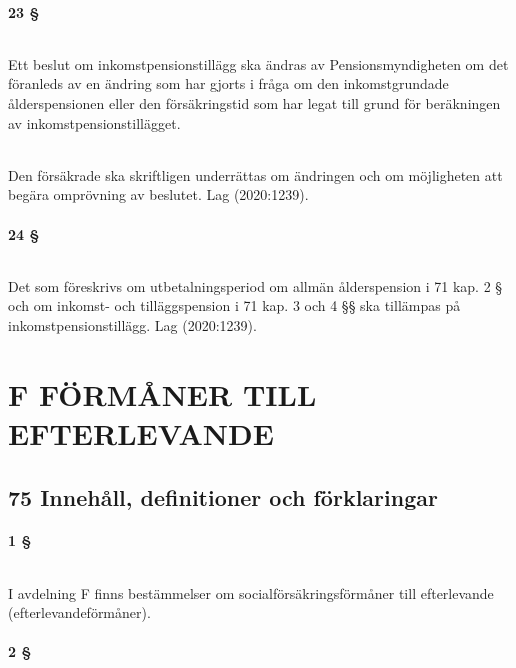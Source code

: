 \documentclass[a4paper,notitlepage,openany,10pt]{book}
\begin{document}
\subsection*{23 §}
\paragraph*{}
Ett beslut om inkomstpensionstillägg ska ändras av Pensionsmyndigheten om det föranleds av en ändring som har gjorts i fråga om den inkomstgrundade ålderspensionen eller den försäkringstid som har legat till grund för beräkningen av inkomstpensionstillägget.
\paragraph*{}
Den försäkrade ska skriftligen underrättas om ändringen och om möjligheten att begära omprövning av beslutet.
Lag (2020:1239).
\subsection*{24 §}
\paragraph*{}
Det som föreskrivs om utbetalningsperiod om allmän ålderspension i 71 kap. 2 § och om inkomst- och tilläggspension i 71 kap. 3 och 4 §§ ska tillämpas på inkomstpensionstillägg.
Lag (2020:1239).
\part*{F FÖRMÅNER TILL EFTERLEVANDE}
\chapter*{75 Innehåll, definitioner och förklaringar}
\subsection*{1 §}
\paragraph*{}
I avdelning F finns bestämmelser om socialförsäkringsförmåner till efterlevande (efterlevandeförmåner).
\subsection*{2 §}
\end{document}
